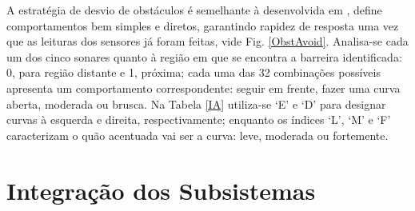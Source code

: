 A estratégia de desvio de obstáculos é semelhante à desenvolvida em \cite{Artigo_1}, define comportamentos bem simples e diretos, garantindo rapidez 
de resposta uma vez que as leituras dos sensores já foram feitas, vide Fig. \ref{ObstAvoid}.
Analisa-se cada um dos cinco sonares quanto à região em que se encontra a barreira identificada: 0, para região distante e 1, próxima;
cada uma das 32 combinações possíveis apresenta um comportamento correspondente: seguir em frente, fazer uma curva aberta, moderada ou brusca.
Na Tabela \ref{IA} utiliza-se \textquoteleft E\textquoteright{} e  \textquoteleft D\textquoteright{} para designar curvas à esquerda e direita, 
respectivamente; enquanto os índices \textquoteleft L\textquoteright{},  \textquoteleft M\textquoteright{} e \textquoteleft F\textquoteright{} 
caracterizam o quão acentuada vai ser a curva: leve, moderada ou fortemente.

\section{Integração dos Subsistemas}